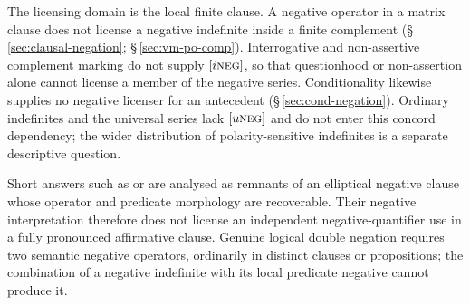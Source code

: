 The licensing domain is the local finite clause. A negative operator in a
matrix clause does not license a negative indefinite inside a finite
complement (§\,\ref{sec:clausal-negation}; §\,\ref{sec:vm-po-comp}). Interrogative 
and non-assertive complement marking do not supply $[i\textsc{neg}]$, so that questionhood
or non-assertion alone cannot license a member of the negative series.
Conditionality likewise supplies no negative licenser for an antecedent
(§\,\ref{sec:cond-negation}).
Ordinary indefinites and the universal series lack $[u\textsc{neg}]$ and do not enter
this concord dependency; the wider distribution of polarity-sensitive
indefinites is a separate descriptive question.

Short answers such as  or  are analysed as remnants of an
elliptical negative clause whose operator and predicate morphology are
recoverable. Their negative interpretation therefore does not license an
independent negative-quantifier use in a fully pronounced affirmative clause.
Genuine logical double negation requires two semantic negative operators,
ordinarily in distinct clauses or propositions; the combination of a negative
indefinite with its local predicate negative cannot produce it.

\FloatBarrier
